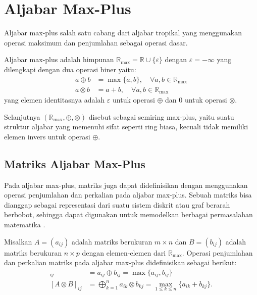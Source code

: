 \section{Aljabar Max-Plus}
Aljabar max-plus salah satu cabang dari aljabar tropikal yang menggunakan operasi maksimum dan penjumlahan sebagai operasi dasar.
\begin{definisi}
  Aljabar max-plus adalah himpunan $\mathbb{R}_{\max} = \mathbb{R} \cup \{\varepsilon\}$ dengan $\varepsilon=-\infty$ yang dilengkapi dengan dua operasi biner yaitu:
  \begin{align*}
    a \oplus b  & = \max\{a, b\}, \quad \forall a, b \in \mathbb{R}_{\max} \\
    a \otimes b & = a + b, \quad \forall a, b \in \mathbb{R}_{\max}
  \end{align*}
  yang elemen identitasnya adalah $\varepsilon$ untuk operasi $\oplus$ dan $0$ untuk operasi $\otimes$.
\end{definisi}

Selanjutnya $(\mathbb{R}_{\max}, \oplus, \otimes)$ disebut sebagai semiring max-plus, yaitu suatu struktur aljabar yang memenuhi sifat seperti ring biasa, kecuali tidak memiliki elemen invers untuk operasi $\oplus$.

\subsection{Matriks Aljabar Max-Plus}
Pada aljabar max-plus, matriks juga dapat didefinisikan dengan menggunakan operasi penjumlahan dan perkalian pada aljabar max-plus. Sebuah matriks bisa dianggap sebagai representasi dari suatu sistem diskrit atau graf berarah berbobot, sehingga dapat digunakan untuk memodelkan berbagai permasalahan matematika \parencite{subiono2015minmaxplus}.
\begin{definisi}\label{def:perkalian_matriks_maxplus}
  Misalkan $A = (a_{ij})$ adalah matriks berukuran $m \times n$ dan $B = (b_{ij})$ adalah matriks berukuran $n \times p$ dengan elemen-elemen dari $\mathbb{R}_{\max}$. Operasi penjumlahan dan perkalian matriks pada aljabar max-plus didefinisikan sebagai berikut:
  \begin{align*}
    [A \oplus B]_{ij}  & = a_{ij} \oplus b_{ij} = \max\{a_{ij}, b_{ij}\}                                           \\
    [A \otimes B]_{ij} & = \bigoplus_{k=1}^{n} a_{ik} \otimes b_{kj} = \max_{1 \leq k \leq n} \{a_{ik} + b_{kj}\}.
  \end{align*}
\end{definisi}

